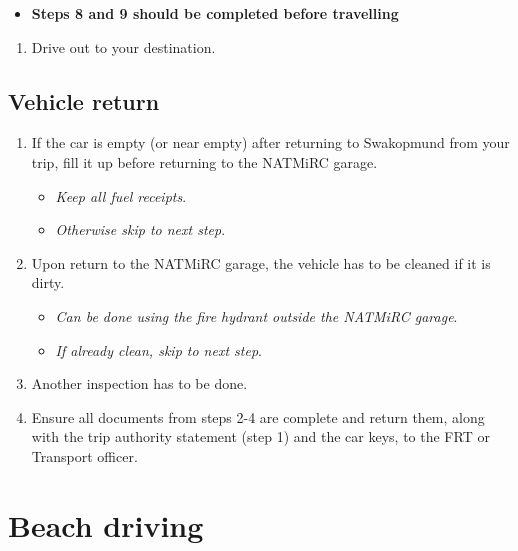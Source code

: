 \documentclass[
  letterpaper,
  DIV=11,
  numbers=noendperiod]{scrreprt}
\providecommand{\tightlist}{%
  \setlength{\itemsep}{0pt}\setlength{\parskip}{0pt}}\usepackage{longtable,booktabs,array}
\begin{document}
\begin{itemize}
\tightlist
\item
  \textbf{Steps 8 and 9 should be completed before travelling}
\end{itemize}

\begin{enumerate}
\def\labelenumi{\arabic{enumi}.}
\setcounter{enumi}{9}
\tightlist
\item
  Drive out to your destination.
\end{enumerate}

\hypertarget{sec-vehicle-return}{%
\subsection{Vehicle return}\label{sec-vehicle-return}}

\begin{enumerate}
\def\labelenumi{\arabic{enumi}.}
\setcounter{enumi}{10}
\tightlist
\item
  If the car is empty (or near empty) after returning to Swakopmund from
  your trip, fill it up before returning to the NATMiRC garage.

  \begin{itemize}
  \tightlist
  \item
    \emph{Keep all fuel receipts}.
  \item
    \emph{Otherwise skip to next step}.
  \end{itemize}
\item
  Upon return to the NATMiRC garage, the vehicle has to be cleaned if it
  is dirty.

  \begin{itemize}
  \tightlist
  \item
    \emph{Can be done using the fire hydrant outside the NATMiRC
    garage}.
  \item
    \emph{If already clean, skip to next step}.
  \end{itemize}
\item
  Another inspection has to be done.
\item
  Ensure all documents from steps 2-4 are complete and return them,
  along with the trip authority statement (step 1) and the car keys, to
  the FRT or Transport officer.
\end{enumerate}

\hypertarget{beach-driving}{%
\section{Beach driving}\label{beach-driving}}
\end{document}
